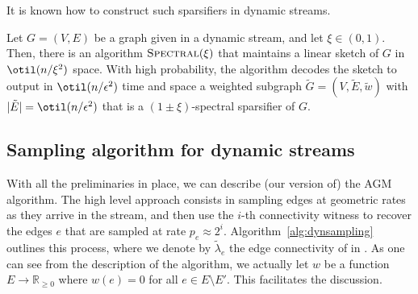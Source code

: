 It is known how to construct such sparsifiers in dynamic streams.
\begin{theorem}
	\label{th:spectral}
	Let $G=(V,E)$ be a graph given in a dynamic stream, and let $\xi \in (0,1)$. Then, there is an algorithm $\textsc{Spectral}(\xi)$ that maintains a linear sketch of $G$ in $\otil(n/\xi^2)$ space. With high probability, the algorithm decodes the sketch to output in $\otil(n/\epsilon^2)$ time and space a weighted subgraph  $\tilde{G} = (V,\tilde{E},\tilde{w})$ with $|\tilde{E}| = \otil(n/\epsilon^2)$ that is a $(1\pm \xi)$-spectral sparsifier of $G$.
\end{theorem}

\subsection{Sampling algorithm for dynamic streams}
\label{subsec:properties}
With all the preliminaries in place, we can describe (our version of) the AGM algorithm. The high level approach consists in sampling edges at geometric rates as they arrive in the stream, and then use the $i$-th connectivity witness to recover the edges $e$ that are sampled at rate $p_e \approx 2^i$. Algorithm~\ref{alg:dynsampling} outlines this process, where we denote by $\tilde{\lambda}_e$ the edge connectivity of  in . As one can see from the description of the algorithm, we actually let $w$ be a function $E \rightarrow \mathbb{R}_{\ge 0}$ where $w(e)=0$ for all $e \in E \setminus E'$. This facilitates the discussion.

